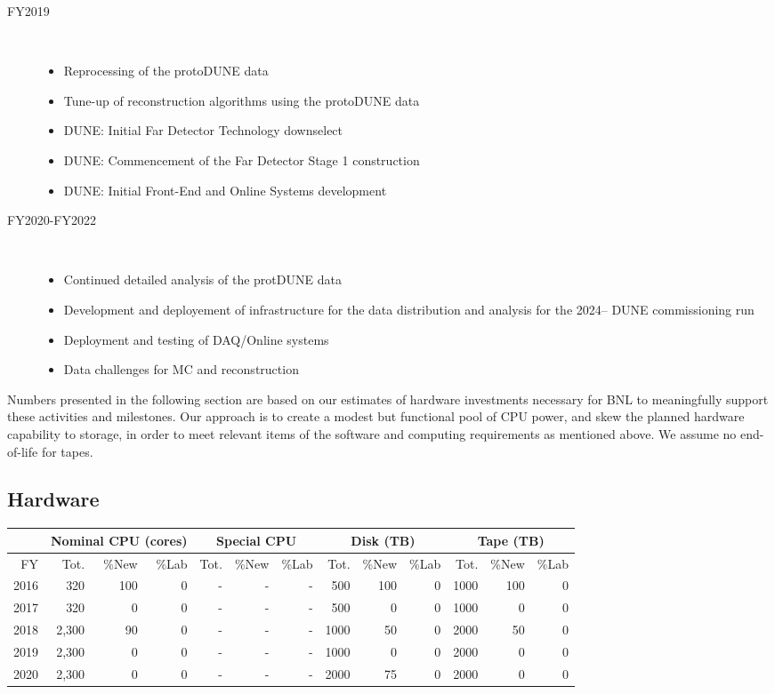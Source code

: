 \documentclass[pdftex,12pt,letter]{article}
\begin{document}
\begin{description}
\item[FY2019] \
\begin{itemize}
\item Reprocessing of the protoDUNE data
\item Tune-up of reconstruction algorithms using the protoDUNE data
\item DUNE: Initial Far Detector Technology downselect
\item DUNE: Commencement of the Far Detector Stage 1 construction
\item DUNE: Initial Front-End and Online Systems development
\end{itemize}

\item[FY2020-FY2022] \
\begin{itemize}
\item Continued detailed analysis of the protDUNE data
\item Development and deployement of infrastructure for the data distribution and analysis for the 2024-- DUNE commissioning run
\item Deployment and testing of DAQ/Online systems
\item Data challenges for MC and reconstruction
\end{itemize}
\end{description}

\noindent Numbers presented in the following section are based on our
estimates of hardware investments necessary for BNL to meaningfully
support these activities and milestones. 
Our approach is to create a modest but functional pool of CPU power,
and skew the planned hardware capability to storage, in order to meet
relevant items of the software and computing requirements as mentioned
above.  We assume no end-of-life for tapes.

\subsection{Hardware}

\begin{tabular}[h]{|r || r|r|r || r|r|r || r|r|r || r|r|r ||}
  \hline
   & \multicolumn{3}{c||}{Nominal CPU (cores)} & \multicolumn{3}{c||}{Special CPU} & \multicolumn{3}{c||}{Disk (TB)} & \multicolumn{3}{c||}{Tape (TB)} \\
   \hline
  FY & Tot. & \%New & \%Lab & Tot. & \%New & \%Lab & Tot. & \%New & \%Lab & Tot. & \%New & \%Lab \\
  \hline
  2016  &  320 &  100   & 0 & - & - & - & 500 & 100 & 0 & 1000 & 100 &  0 \\
  \hline
  2017 &  320 &   0     & 0 & - & - & - & 500  & 0 & 0 & 1000 & 0    &  0 \\
  \hline
  2018 &  2,300 &   90     & 0 & - & - & - & 1000  & 50   & 0 & 2000 & 50      &  0 \\
  \hline
  2019  &  2,300 &  0    & 0 & - & - & - & 1000  &  0 & 0 & 2000 & 0     &  0 \\
  \hline
  2020 &  2,300 &  0     & 0 & - & - & - & 2000  & 75   & 0 & 2000 & 0    &  0 \\
  \hline
\end{tabular}
\end{document}
